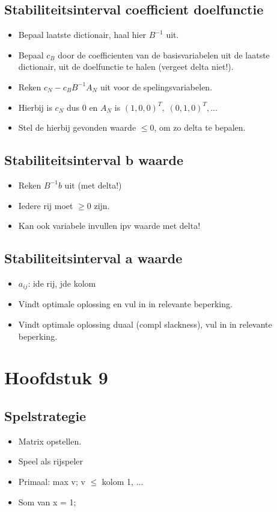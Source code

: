 \documentclass[10pt]{report}
\begin{document}
  \section{Stabiliteitsinterval coefficient doelfunctie}
    \begin{itemize}
      \item Bepaal laatste dictionair, haal hier $B^{-1}$ uit.
      \item Bepaal $c_B$ door de coefficienten van de basisvariabelen uit de laatste dictionair, uit de doelfunctie te halen (vergeet delta niet!).
      \item Reken $c_N - c_B B^{-1} A_N$ uit voor de spelingsvariabelen.
      \item Hierbij is $c_N$ dus 0 en $A_N$ is $(1, 0, 0)^T,\; (0, 1, 0)^T, ...$
      \item Stel de hierbij gevonden waarde $\leq 0$, om zo delta te bepalen.
    \end{itemize}

  \section{Stabiliteitsinterval b waarde}
    \begin{itemize}
      \item Reken $B^{-1} b$ uit (met delta!)
      \item Iedere rij moet $\geq 0$ zijn.
      \item Kan ook variabele invullen ipv waarde met delta!
    \end{itemize}

  \section{Stabiliteitsinterval a waarde}
    \begin{itemize}
      \item $a_{ij}$: ide rij, jde kolom
      \item Vindt optimale oplossing en vul in in relevante beperking.
      \item Vindt optimale oplossing duaal (compl slackness), vul in in relevante beperking.

    \end{itemize}

\chapter{Hoofdstuk 9}
  \section{Spelstrategie}
    \begin{itemize}
      \item Matrix opstellen.
      \item Speel als rijspeler
      \item Primaal: max v; v $\leq$ kolom 1, ...
      \item Som van x = 1;
    \end{itemize}
\end{document}
